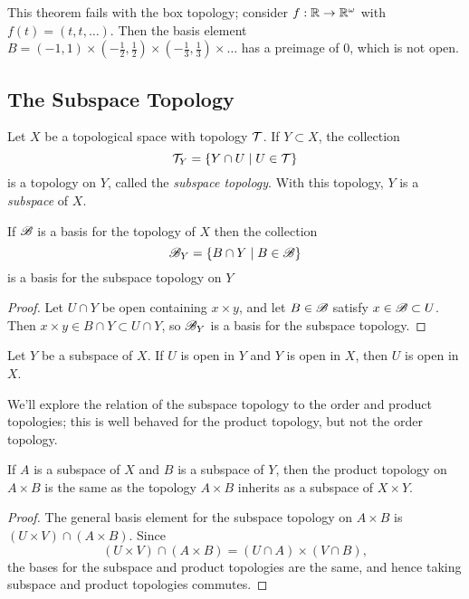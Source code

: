 \documentclass[10pt]{report}
\begin{document}
This theorem fails with the box topology; consider $f:\mathbb{R} \rightarrow \mathbb{R}^\omega$ with $f(t) = (t,t,\dots)$.
Then the basis element $B = (-1,1) \times (-\frac{1}{2},\frac{1}{2}) \times (-\frac{1}{3},\frac{1}{3}) \times \dots$ has a preimage of 0, which is not open.

\subsection{The Subspace Topology}
\begin{definition}
  Let $X$ be a topological space with topology $\mathcal{T}$.
  If $Y  \subset X$, the collection
  \[ \mathcal{T}_Y = \left\{ Y \cap U \mid U \in \mathcal{T} \right\} \]
  is a topology on $Y$, called the \emph{subspace topology}.
  With this topology, $Y$ is a \emph{subspace} of $X$.
\end{definition}

\begin{lemma}
  If $\mathscr{B}$ is a basis for the topology of $X$ then the collection
  \[
    \mathscr{B}_Y = \left\{ B \cap Y \mid B \in \mathscr{B} \right\}
  \]
  is a basis for the subspace topology on $Y$
\end{lemma}
\begin{proof}
  Let $U \cap Y$ be open containing $x \times y$, and let $B \in \mathscr{B}$ satisfy $x \in \mathscr{B} \subset U$.
  Then $x \times y \in B \cap Y \subset U \cap Y$, so $\mathscr{B}_Y$ is a basis for the subspace topology.
\end{proof}

\begin{lemma}
  Let $Y$ be a subspace of $X$. If $U$ is open in $Y$ and $Y$ is open in $X$, then $U$ is open in $X$.
\end{lemma}

We'll explore the relation of the subspace topology to the order and product topologies;
this is well behaved for the product topology, but not the order topology.

\begin{theorem}
  If $A$ is a subspace of $X$ and $B$ is a subspace of $Y$, then the product topology on $A \times B$ is the same as the topology $A \times B$ inherits as a subspace of $X \times Y$.
\end{theorem}
\begin{proof}
  The general basis element for the subspace topology on $A \times B$ is $(U \times V) \cap (A \times B)$.
  Since
  \[
    (U \times V) \cap (A \times B) = (U \cap A) \times (V \cap B),  
  \]
  the bases for the subspace and product topologies are the same, and hence taking subspace and product topologies commutes.
\end{proof}
\end{document}
